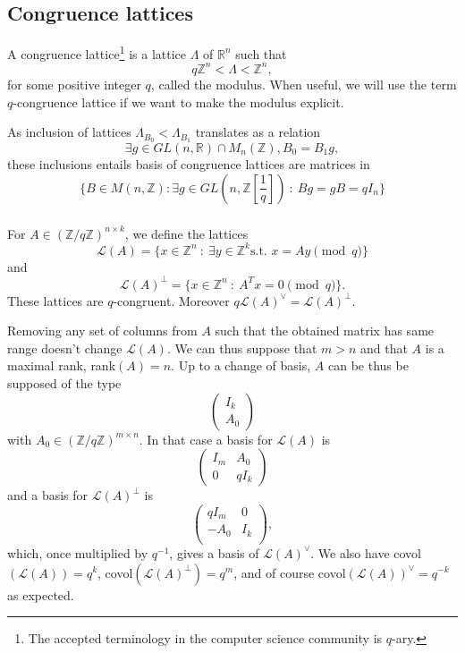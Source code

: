 \documentclass{article}
\begin{document}
\subsection{Congruence lattices}
A congruence lattice\footnote{The accepted terminology in the computer science community is $q$-ary.} is a lattice $\Lambda$ of $\mathbb R^n$ such that 
\[q\mathbb Z^n < \Lambda < \mathbb Z^n,\]
for some positive integer $q$, called the modulus. When useful, we will use the term $q$-congruence lattice if we want to make the modulus explicit.
 
As inclusion of lattices $\Lambda_{B_0} < \Lambda_{B_1}$ translates as a relation
\[\exists g \in  GL(n,\mathbb R) \cap M_n(\mathbb Z) , B_0 = B_1g , \] 
these inclusions entails basis of congruence lattices are matrices in 
\[\{B\in M(n,\mathbb Z) : \exists g\in GL(n,\mathbb Z[\frac{1}{q}] ) \ : \ Bg = gB = qI_n \}\]
   
\subsubsection{}

For $A\in (\mathbb Z/q\mathbb Z)^{n\times k}$, we define the lattices
\[\mathcal L(A) = \{x\in\mathbb Z^{n} \ : \ \exists y\in\mathbb Z^k \text{s.t. } x = Ay \pmod{q} \}\]
and
\[\mathcal L(A)^\perp = \{x\in\mathbb Z^{n} \ :\ A^{T}x = 0 \pmod{q} \}.\]
These lattices are $q$-congruent. Moreover $q\mathcal L(A)^\vee = \mathcal L(A)^\perp$.   

Removing any set of columns from $A$ such that the obtained matrix has same range doesn't change $\mathcal L(A)$. We can thus suppose that $m>n$ and that $A$ is a maximal rank, rank$(A)=n$. Up to a change of basis, $A$ can be thus be supposed of the type 
\[\begin{pmatrix}
I_k \\
A_0
\end{pmatrix}\]
with $A_0\in (\mathbb Z/q\mathbb Z)^{m\times n}$. In that case a basis for $\mathcal L(A)$ is 
\[
\begin{pmatrix}
  I_m & A_0 \\ 0 & qI_k 
\end{pmatrix}
\]
and a basis for $\mathcal L(A)^\perp$ is 
\[
\begin{pmatrix}
  q I_m & 0 \\  - A_0 & I_k \\
\end{pmatrix},
\]
which, once multiplied by $q^{-1}$, gives a basis of $\mathcal L(A)^\vee$. We also have covol$(\mathcal L(A))=q^{k}$, covol$(\mathcal L(A)^\perp)=q^{m}$, and of course covol$(\mathcal L(A))^\vee=q^{-k}$ as expected.
\end{document}
